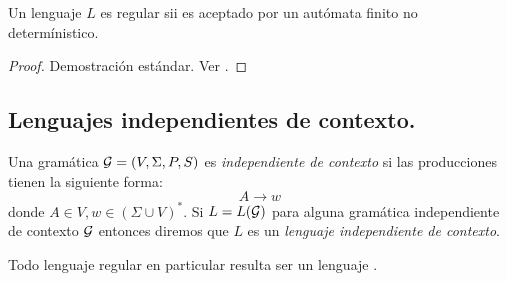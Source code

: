 \documentclass[tesis.tex]{subfiles}
\begin{document}
\begin{teo}
	Un lenguaje $L$ es regular sii es aceptado por un autómata finito no determínistico.
\end{teo}

\begin{proof}
	Demostración estándar. Ver \cite{hopcraft-ullman}.
\end{proof}









\subsection{Lenguajes independientes de contexto.}
\begin{deff}
	Una gramática ${\cal G} = (V, \Sigma, P, S) $ es \emph{independiente de contexto} si las producciones tienen la siguiente forma:
	\begin{equation*}
		A \to w
	\end{equation*}
	donde $A \in V, w \in (\Sigma \cup V)^*$.  
	Si $L=L({\cal G})$ para alguna gramática independiente de contexto $\cal G$ entonces diremos que $L$ es un \emph{lenguaje independiente de contexto}.
\end{deff}

\begin{obs}
	Todo lenguaje regular en particular resulta ser un lenguaje \ic.
\end{obs}
\end{document}
